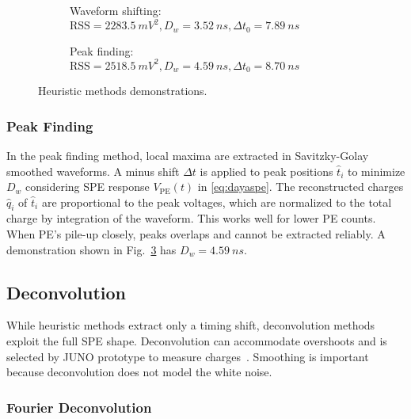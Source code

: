 \begin{figure}[H]
  \begin{subfigure}{0.5\textwidth}
    \centering
    \scalebox{0.36}{}
    \caption{\label{fig:shifting}Waveform shifting: $\mathrm{RSS}=\SI{2283.5}{mV^2},D_w=\SI{3.52}{ns},\Delta t_0=\SI{7.89}{ns}$}
  \end{subfigure}
  \begin{subfigure}{0.5\textwidth}
    \centering
    \scalebox{0.36}{}
    \caption{\label{fig:peak}Peak finding: $\mathrm{RSS}=\SI{2518.5}{mV^2},D_w=\SI{4.59}{ns},\Delta t_0=\SI{8.70}{ns}$}
  \end{subfigure}
  \caption{Heuristic methods demonstrations.}
\end{figure}

\subsubsection{Peak Finding}
\label{sec:findpeak}

In the peak finding method, local maxima are extracted in Savitzky-Golay smoothed waveforms.  A minus shift $\Delta t$ is applied to peak positions $\hat{t}_i$ to minimize $D_w$ considering SPE response $V_\mathrm{PE}(t)$ in \eqref{eq:dayaspe}. The reconstructed charges $\hat{q}_i$ of $\hat{t}_i$ are proportional to the peak voltages, which are normalized to the total charge by integration of the waveform.  This works well for lower PE counts. When PE's pile-up closely, peaks overlaps and cannot be extracted reliably. A demonstration shown in Fig.~\ref{fig:peak} has $D_w = \SI{4.59}{ns}$. 

\subsection{Deconvolution}
While heuristic methods extract only a timing shift, deconvolution methods exploit the full SPE shape.  Deconvolution can accommodate overshoots and is selected by JUNO prototype to measure charges~\cite{zhang_comparison_2019}.  Smoothing is important because deconvolution does not model the white noise.

\subsubsection{Fourier Deconvolution}

